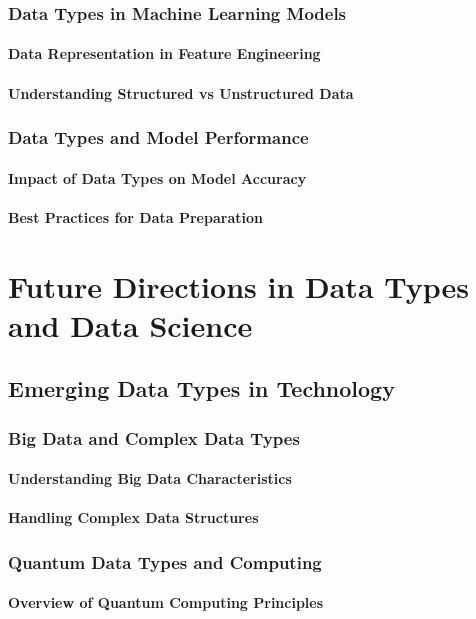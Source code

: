 \documentclass[12pt, oneside]{book}
\begin{document}
\subsection{Data Types in Machine Learning Models}
\subsubsection{Data Representation in Feature Engineering}
\subsubsection{Understanding Structured vs Unstructured Data}
\subsection{Data Types and Model Performance}
\subsubsection{Impact of Data Types on Model Accuracy}
\subsubsection{Best Practices for Data Preparation}

\chapter{Future Directions in Data Types and Data Science}
\section{Emerging Data Types in Technology}
\subsection{Big Data and Complex Data Types}
\subsubsection{Understanding Big Data Characteristics}
\subsubsection{Handling Complex Data Structures}
\subsection{Quantum Data Types and Computing}
\subsubsection{Overview of Quantum Computing Principles}
\end{document}
